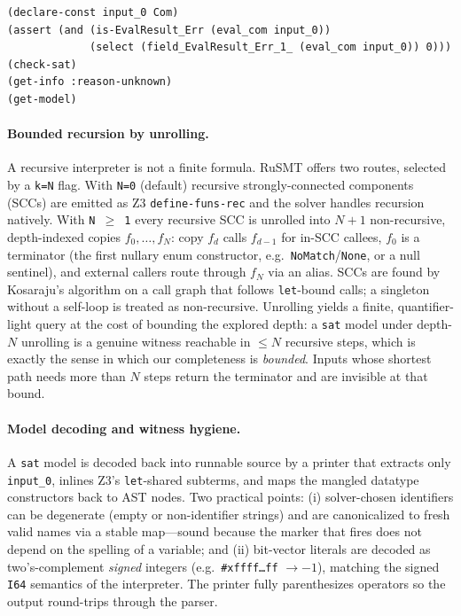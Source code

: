 \documentclass[11pt,a4paper]{article}
\theoremstyle{definition}
\theoremstyle{remark}
\newcommand{\rusmt}{RuSMT}
\newcommand{\imp}{IMP}
\newcommand{\code}[1]{\texttt{#1}}
\begin{document}
\begin{lstlisting}[style=smt,caption={The synthesis query for one \imp{} marker
(text backend). ``Find an \code{input\_0\,:\,Com} whose evaluation is
\code{EvalResult::Err} carrying marker $0$.''},label={lst:query}]
(declare-const input_0 Com)
(assert (and (is-EvalResult_Err (eval_com input_0))
             (select (field_EvalResult_Err_1_ (eval_com input_0)) 0)))
(check-sat)
(get-info :reason-unknown)
(get-model)
\end{lstlisting}

\paragraph{Bounded recursion by unrolling.}
A recursive interpreter is not a finite formula. \rusmt{} offers two routes,
selected by a \code{k=N} flag. With \code{N=0} (default) recursive
strongly-connected components (SCCs) are emitted as Z3 \code{define-funs-rec} and
the solver handles recursion natively. With \code{N\,$\geq$\,1} every recursive SCC
is unrolled into $N{+}1$ non-recursive, depth-indexed copies $f_0,\dots,f_N$:
copy $f_d$ calls $f_{d-1}$ for in-SCC callees, $f_0$ is a terminator (the first
nullary enum constructor, e.g.\ \code{NoMatch}/\code{None}, or a null sentinel),
and external callers route through $f_N$ via an alias. SCCs are found by
Kosaraju's algorithm on a call graph that follows \code{let}-bound calls; a
singleton without a self-loop is treated as non-recursive. Unrolling yields a finite,
quantifier-light query at the cost of bounding the explored depth: a \code{sat}
model under depth-$N$ unrolling is a genuine witness reachable in $\leq N$
recursive steps, which is exactly the sense in which our completeness is
\emph{bounded}. Inputs whose shortest path needs more than $N$ steps return the
terminator and are invisible at that bound.

\paragraph{Model decoding and witness hygiene.}
A \code{sat} model is decoded back into runnable source by a printer that extracts
only \code{input\_0}, inlines Z3's \code{let}-shared subterms, and maps the
mangled datatype constructors back to AST nodes. Two practical points: (i)
solver-chosen identifiers can be degenerate (empty or non-identifier strings) and
are canonicalized to fresh valid names via a stable map---sound because the marker
that fires does not depend on the spelling of a variable; and (ii) bit-vector
literals are decoded as two's-complement \emph{signed} integers (e.g.\
\code{\#xffff\dots ff} $\to -1$), matching the signed \code{I64} semantics of the
interpreter. The printer fully parenthesizes operators so the output round-trips
through the parser.
\end{document}
